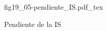 \begin{figure}[h]
\centering
\def\svgwidth{0.5\textwidth}
{fig19_05-pendiente_IS.pdf_tex}
\caption{Pendiente de la IS}
\label{fig19_05-pendiente_IS}
\end{figure}